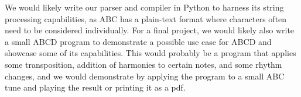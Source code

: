 We would likely write our parser and compiler in Python to harness its string processing capabilities, as ABC has a plain-text format where characters often need to be considered individually.
	For a final project, we would likely also write a small ABCD program to demonstrate a possible use case for ABCD and showcase some of its capabilities. This would probably be a program that applies some transposition, addition of harmonies to certain notes, and some rhythm changes, and we would demonstrate by applying the program to a small ABC tune and playing the result or printing it as a pdf.

